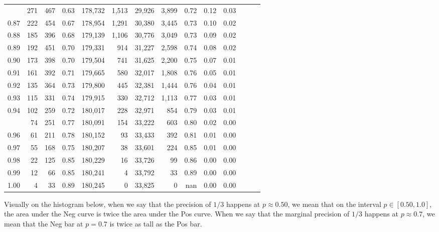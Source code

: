 \begin{tabular}{rrrrrrrrrrrrrr}
\begin{comment}
0.86 &    271 &  467 &  0.63 &  178,732 &    1,513 &  29,926 &   3,899 &  0.72 &  0.12 &      0.03 \\
0.87 &    222 &  454 &  0.67 &  178,954 &    1,291 &  30,380 &   3,445 &  0.73 &  0.10 &      0.02 \\
0.88 &    185 &  396 &  0.68 &  179,139 &    1,106 &  30,776 &   3,049 &  0.73 &  0.09 &      0.02 \\
0.89 &    192 &  451 &  0.70 &  179,331 &      914 &  31,227 &   2,598 &  0.74 &  0.08 &      0.02 \\
0.90 &    173 &  398 &  0.70 &  179,504 &      741 &  31,625 &   2,200 &  0.75 &  0.07 &      0.01 \\
0.91 &    161 &  392 &  0.71 &  179,665 &      580 &  32,017 &   1,808 &  0.76 &  0.05 &      0.01 \\
0.92 &    135 &  364 &  0.73 &  179,800 &      445 &  32,381 &   1,444 &  0.76 &  0.04 &      0.01 \\
0.93 &    115 &  331 &  0.74 &  179,915 &      330 &  32,712 &   1,113 &  0.77 &  0.03 &      0.01 \\
0.94 &    102 &  259 &  0.72 &  180,017 &      228 &  32,971 &     854 &  0.79 &  0.03 &      0.01 \\
\end{comment}
0.95 &     74 &  251 &  0.77 &  180,091 &      154 &  33,222 &     603 &  0.80 &  0.02 &      0.00 \\
0.96 &     61 &  211 &  0.78 &  180,152 &       93 &  33,433 &     392 &  0.81 &  0.01 &      0.00 \\
0.97 &     55 &  168 &  0.75 &  180,207 &       38 &  33,601 &     224 &  0.85 &  0.01 &      0.00 \\
0.98 &     22 &  125 &  0.85 &  180,229 &       16 &  33,726 &      99 &  0.86 &  0.00 &      0.00 \\
0.99 &     12 &   66 &  0.85 &  180,241 &        4 &  33,792 &      33 &  0.89 &  0.00 &      0.00 \\
1.00 &      4 &   33 &  0.89 &  180,245 &        0 &  33,825 &       0 &   nan &  0.00 &      0.00 \\
\bottomrule
\end{tabular}

\newpage

Visually on the histogram below, when we say that the precision of $1/3$ happens at $p \approx 0.50$, we mean that on the interval $p \in [0.50,1.0]$, the area under the Neg curve is twice the area under the Pos curve.  When we say that the marginal precision of $1/3$ happens at $p \approx 0.7$, we mean that the Neg bar at $p=0.7$ is twice as tall as the Pos bar.  

